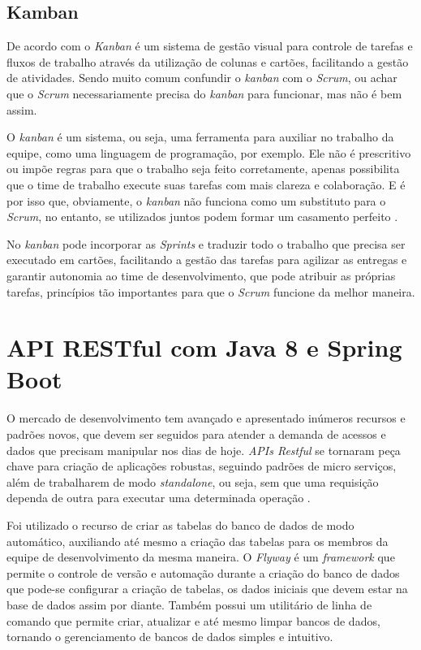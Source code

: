     
\subsection{Kamban}

    De acordo com  o \textit{Kanban} é um sistema de gestão visual para controle de tarefas e fluxos de trabalho através da utilização de colunas e cartões, facilitando a gestão de atividades. Sendo muito comum confundir o \textit{kanban} com o \textit{Scrum}, ou achar que o \textit{Scrum} necessariamente precisa do \textit{kanban} para funcionar, mas não é bem assim.   
    
    O \textit{kanban} é um sistema, ou seja, uma ferramenta para auxiliar no trabalho da equipe, como uma linguagem de programação, por exemplo. Ele não é prescritivo ou impõe regras para que o trabalho seja feito corretamente, apenas possibilita que o time de trabalho execute suas tarefas com mais clareza e colaboração. E é por isso que, obviamente, o \textit{kanban} não funciona como um substituto para o \textit{Scrum}, no entanto, se utilizados juntos podem formar um casamento perfeito \cite{kamban}.
    
    No \textit{kanban} pode incorporar as \textit{Sprints} e traduzir todo o trabalho que precisa ser executado em cartões, facilitando a gestão das tarefas para agilizar as entregas e garantir autonomia ao time de desenvolvimento, que pode atribuir as próprias tarefas, princípios tão importantes para que o \textit{Scrum} funcione da melhor maneira.
    

\section{API RESTful com Java 8 e Spring Boot}

    O mercado de desenvolvimento tem avançado e apresentado inúmeros recursos e padrões novos, que devem ser seguidos para atender a demanda de acessos e dados que precisam manipular nos dias de hoje. \textit{APIs Restful} se tornaram peça chave para criação de aplicações robustas, seguindo padrões de micro serviços, além de trabalharem de modo \textit{standalone}, ou seja, sem que uma requisição dependa de outra para executar uma determinada operação \cite{souza}.

    Foi utilizado o recurso de criar as tabelas do banco de dados de modo automático, auxiliando até mesmo a criação das tabelas para os membros da equipe de desenvolvimento da mesma maneira. O \textit{Flyway} é um \textit{framework} que permite o controle de versão e automação durante a criação do banco de dados que pode-se configurar a criação de tabelas, os dados iniciais que devem estar na base de dados assim por diante. Também possui um utilitário de linha de comando que permite criar, atualizar e até mesmo limpar bancos de dados, tornando o gerenciamento de bancos de dados simples e intuitivo.

